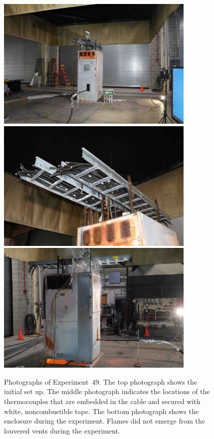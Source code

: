 \begin{figure}[p]
\centering
\includegraphics[height=2.50in]{../FIGURES/Test_49_setup} \\
\includegraphics[height=2.50in]{../FIGURES/Test_49_cables} \\
\includegraphics[height=2.50in]{../FIGURES/Test_49_fire}
\caption[Photographs of Experiment~49]{Photographs of Experiment~49. The top photograph shows the initial set up. The middle photograph indicates the locations of the thermocouples that are embedded in the cable and secured with white, noncombustible tape. The bottom photograph shows the enclosure during the experiment. Flames did not emerge from the louvered vents during the experiment. }
\label{fig:Test_49_photos}
\end{figure}



